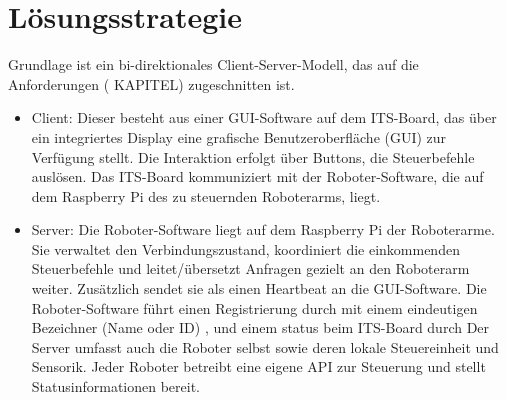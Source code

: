 \chapter{Lösungsstrategie}


Grundlage ist ein bi-direktionales Client-Server-Modell, das auf die Anforderungen ( KAPITEL)
zugeschnitten ist.
 

\begin{itemize}
	\item{Client:} Dieser besteht aus einer GUI-Software auf dem ITS-Board, das über ein integriertes Display eine grafische Benutzeroberfläche (GUI) zur Verfügung stellt. Die Interaktion erfolgt über Buttons, die Steuerbefehle auslösen. Das ITS-Board kommuniziert mit der Roboter-Software, die auf dem Raspberry Pi des zu steuernden Roboterarms, liegt.
	
	\item{Server:} Die Roboter-Software liegt auf dem Raspberry Pi der Roboterarme. Sie verwaltet den Verbindungszustand, koordiniert die einkommenden Steuerbefehle und leitet/übersetzt Anfragen gezielt an den Roboterarm weiter. Zusätzlich sendet sie als einen Heartbeat an die GUI-Software. Die Roboter-Software führt einen Registrierung durch mit einem eindeutigen Bezeichner (Name oder ID) , und einem status beim ITS-Board durch
	Der Server umfasst auch die Roboter selbst sowie deren lokale Steuereinheit und Sensorik. Jeder Roboter betreibt eine eigene API zur Steuerung und stellt Statusinformationen bereit. 	
\end{itemize} 

